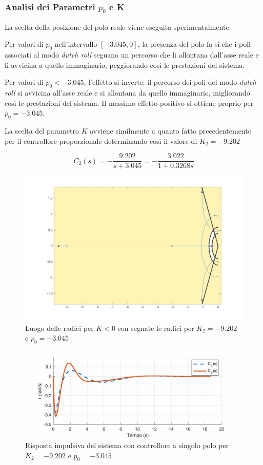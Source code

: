 \subsubsection{Analisi dei Parametri \texorpdfstring{$p_0$}{p0} e K}\label{subsubsec:analisi_parametri_controllore_polo_singolo}
La scelta della posizione del polo reale viene eseguita sperimentalmente:
\begin{sitemize}
    \item Per valori di $p_0$ nell'intervallo $[-3.045, 0]$, la presenza del polo fa sì che i poli associati al modo \textit{dutch roll} seguano un percorso che li allontana dall'asse reale e li avvicina a quello immaginario, peggiorando così le prestazioni del sistema.
    \item Per valori di $p_0 < -3.045$, l'effetto si inverte: il percorso dei poli del modo \textit{dutch roll} si avvicina all'asse reale e si allontana da quello immaginario, migliorando così le prestazioni del sistema. Il massimo effetto positivo si ottiene proprio per $p_0 = -3.045$.
\end{sitemize}

La scelta del parametro $K$ avviene similmente a quanto fatto precedentemente per il controllore proporzionale determinando così il valore di $K_2 = -9.202$

\begin{equation*}
    C_2(s) = -\frac{9.202}{s + 3.045} = -\frac{3.022}{1 + 0.3268s}
\end{equation*}

\begin{figure}[H]
    \centering
    \includegraphics[width=0.6\linewidth]{Immagini/root_pole_lateral.pdf}
    \caption{Luogo delle radici per $K < 0$ con segnate le radici per $K_2 = -9.202$ e $p_0 = -3.045$}
\end{figure}

\begin{figure}[H]
    \centering
    \includegraphics[width=0.7\linewidth]{Immagini/pole_impulse_lateral.pdf}
    \caption{Risposta impulsiva del sistema con controllore a singolo polo per $K_2 = -9.202$ e $p_0 = -3.045$}
\end{figure}

